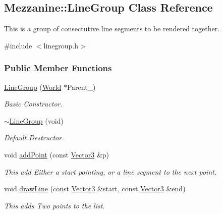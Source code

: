 \hypertarget{classMezzanine_1_1LineGroup}{
\subsection{Mezzanine::LineGroup Class Reference}
\label{classMezzanine_1_1LineGroup}
}


This is a group of consectutive line segments to be rendered together.  




{\ttfamily \#include $<$linegroup.h$>$}

\subsubsection*{Public Member Functions}
\begin{DoxyCompactItemize}
\item 
\hyperlink{classMezzanine_1_1LineGroup_a8789254da1d3e930681b793165fedeca}{LineGroup} (\hyperlink{classMezzanine_1_1World}{World} $\ast$Parent\_\-)
\begin{DoxyCompactList}\small\item\em Basic Constructor. \item\end{DoxyCompactList}\item 
\hyperlink{classMezzanine_1_1LineGroup_afd14821b5b54fff9d670458748125f3f}{$\sim$LineGroup} (void)
\begin{DoxyCompactList}\small\item\em Default Destructor. \item\end{DoxyCompactList}\item 
void \hyperlink{classMezzanine_1_1LineGroup_a3326fcfa0207505082af2610d73c2e46}{addPoint} (const \hyperlink{classMezzanine_1_1Vector3}{Vector3} \&p)
\begin{DoxyCompactList}\small\item\em This add Either a start pointing, or a line segment to the next point. \item\end{DoxyCompactList}\item 
void \hyperlink{classMezzanine_1_1LineGroup_acadb6f8ccbe70828b094f07a11f276ac}{drawLine} (const \hyperlink{classMezzanine_1_1Vector3}{Vector3} \&start, const \hyperlink{classMezzanine_1_1Vector3}{Vector3} \&end)
\begin{DoxyCompactList}\small\item\em This adds Two points to the list. \item\end{DoxyCompactList}\item 

\end{DoxyCompactItemize}
